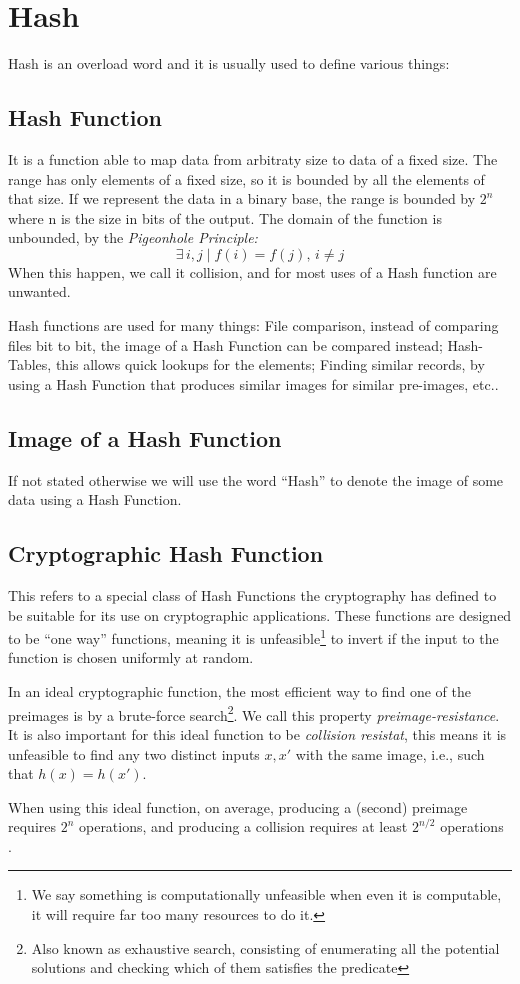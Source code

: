 \section{Hash}
Hash is an overload word and it is usually used to define various things:

\subsection{Hash Function}
It is a function able to map data from arbitraty size to data of a fixed size.
The range has only elements of a fixed size, so it is bounded by all the
  elements of that size.
If we represent the data in a binary base, the range is bounded by $2^n$ where n
  is the size in bits of the output.
The domain of the function is unbounded, by the \textit{Pigeonhole
  Principle:}
\begin{equation}
	\exists \, i, j \mid f(i) = f(j), \, i \neq j
\end{equation}
When this happen, we call it collision, and for most uses of a Hash function are
  unwanted.

Hash functions are used for many things: File comparison, instead of comparing
  files bit to bit, the image of a Hash Function can be compared instead;
  Hash-Tables, this allows quick lookups for the elements; Finding similar
  records, by using a Hash Function that produces similar images for similar
  pre-images, etc..

\subsection{Image of a Hash Function}

If not stated otherwise we will use the word ``Hash'' to denote the image of
  some data using a Hash Function.

\subsection{Cryptographic Hash Function}
This refers to a special class of Hash Functions the cryptography has defined
  to be suitable for its use on cryptographic applications. These functions are
  designed to be ``one way'' functions, meaning it is unfeasible\footnote{We %
  say something is computationally unfeasible when even it is computable, it
  will require far too many resources to do it.} to invert if the input to the
  function is chosen uniformly at random.

In an ideal cryptographic function, the most efficient way to find one of the
  preimages is by a brute-force search\footnote{Also known as exhaustive search,
  consisting of enumerating all the potential solutions and checking which of
  them satisfies the predicate}. We call this property
  \textit{preimage-resistance}.
It is also important for this ideal function to be \textit{collision
  resistat}, this means it is unfeasible to find any two distinct inputs
  $x, x'$ with the same image, i.e., such that $h(x) = h(x')$.

When using this ideal function, on average, producing a (second) preimage
  requires $2^n$ operations, and producing a collision requires at least
  $2^{n / 2} $ operations \cite{preneel1993analysis}.
